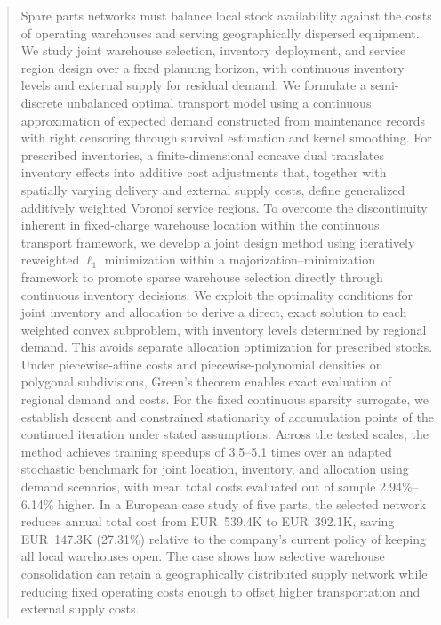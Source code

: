 \documentclass[a4paper,fleqn]{cas-sc}
\theoremstyle{remark}
\theoremstyle{plain}
\begin{document}
\begin{abstract}
Spare parts networks must balance local stock availability against the costs of operating warehouses and serving geographically dispersed equipment. We study joint warehouse selection, inventory deployment, and service region design over a fixed planning horizon, with continuous inventory levels and external supply for residual demand. We formulate a semi-discrete unbalanced optimal transport model using a continuous approximation of expected demand constructed from maintenance records with right censoring through survival estimation and kernel smoothing. For prescribed inventories, a finite-dimensional concave dual translates inventory effects into additive cost adjustments that, together with spatially varying delivery and external supply costs, define generalized additively weighted Voronoi service regions. To overcome the discontinuity inherent in fixed-charge warehouse location within the continuous transport framework, we develop a joint design method using iteratively reweighted $\ell_1$ minimization within a majorization--minimization framework to promote sparse warehouse selection directly through continuous inventory decisions. We exploit the optimality conditions for joint inventory and allocation to derive a direct, exact solution to each weighted convex subproblem, with inventory levels determined by regional demand. This avoids separate allocation optimization for prescribed stocks. Under piecewise-affine costs and piecewise-polynomial densities on polygonal subdivisions, Green's theorem enables exact evaluation of regional demand and costs. For the fixed continuous sparsity surrogate, we establish descent and constrained stationarity of accumulation points of the continued iteration under stated assumptions. Across the tested scales, the method achieves training speedups of 3.5--5.1 times over an adapted stochastic benchmark for joint location, inventory, and allocation using demand scenarios, with mean total costs evaluated out of sample 2.94\%--6.14\% higher. In a European case study of five parts, the selected network reduces annual total cost from EUR~539.4K to EUR~392.1K, saving EUR~147.3K (27.31\%) relative to the company's current policy of keeping all local warehouses open. The case shows how selective warehouse consolidation can retain a geographically distributed supply network while reducing fixed operating costs enough to offset higher transportation and external supply costs.
\end{abstract}
\end{document}
